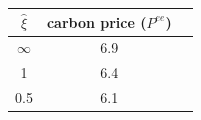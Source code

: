 \begin{tabular}{ccc}
\hline
\rule{0pt}{1.2em}
 $\widehat \xi$ &  carbon price ($P^{ee}$)\\
\hline

  $\infty$ & 6.9 \\
  1 & 6.4 \\
  0.5 & 6.1\\

\hline
\end{tabular}